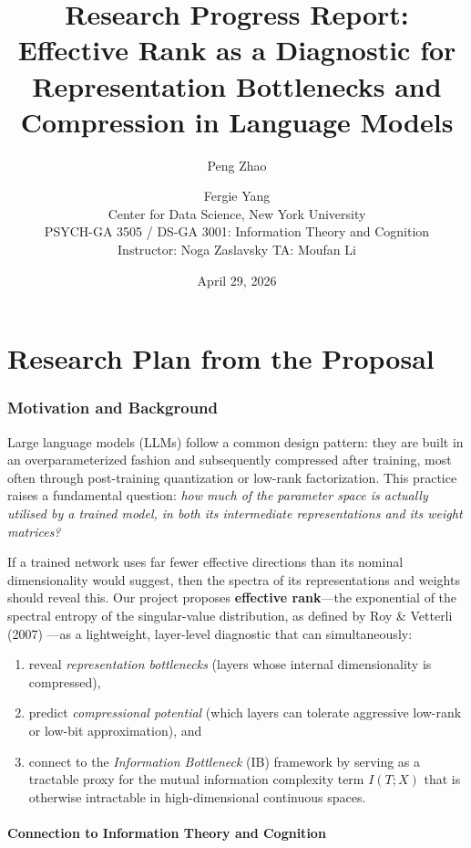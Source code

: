 \documentclass[11pt]{article}
\title{Research Progress Report:\\Effective Rank as a Diagnostic for Representation Bottlenecks and Compression in Language Models}
\author{Peng Zhao \and Fergie Yang\\[6pt]
Center for Data Science, New York University\\
PSYCH-GA 3505 / DS-GA 3001: Information Theory and Cognition\\
Instructor: Noga Zaslavsky \quad TA: Moufan Li}
\date{April 29, 2026}
\begin{document}
\maketitle

\tableofcontents
\newpage

\part{Research Plan from the Proposal}

\section{Motivation and Background}

Large language models (LLMs) follow a common design pattern: they are built in an overparameterized fashion and subsequently compressed after training, most often through post-training quantization or low-rank factorization.  This practice raises a fundamental question: \emph{how much of the parameter space is actually utilised by a trained model, in both its intermediate representations and its weight matrices?}

If a trained network uses far fewer effective directions than its nominal dimensionality would suggest, then the spectra of its representations and weights should reveal this.  Our project proposes \textbf{effective rank}---the exponential of the spectral entropy of the singular-value distribution, as defined by Roy \& Vetterli (2007) \cite{roy2007effective}---as a lightweight, layer-level diagnostic that can simultaneously:
\begin{enumerate}[label=(\alph*)]
    \item reveal \emph{representation bottlenecks} (layers whose internal dimensionality is compressed),
    \item predict \emph{compressional potential} (which layers can tolerate aggressive low-rank or low-bit approximation), and
    \item connect to the \emph{Information Bottleneck} (IB) framework by serving as a tractable proxy for the mutual information complexity term $I(T;X)$ that is otherwise intractable in high-dimensional continuous spaces.
\end{enumerate}

\subsection{Connection to Information Theory and Cognition}
\end{document}
